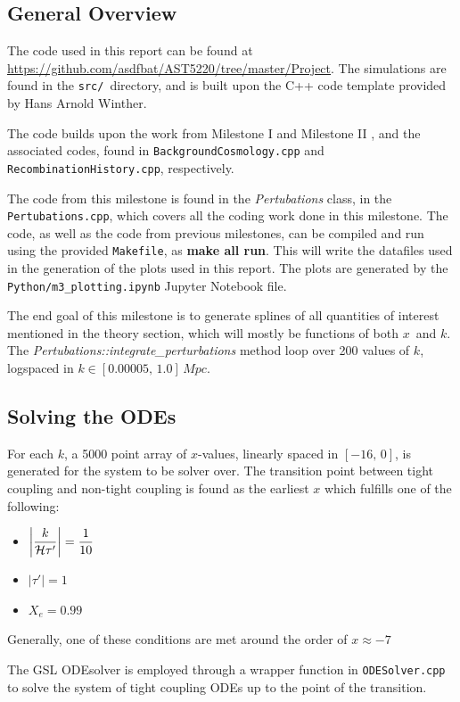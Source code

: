 \documentclass[10pt, a4paper]{article}
\begin{document}
\subsection{General Overview}
The code used in this report can be found at \url{https://github.com/asdfbat/AST5220/tree/master/Project}. The simulations are found in the \texttt{src/} directory, and is built upon the C++ code template provided by Hans Arnold Winther.

The code builds upon the work from Milestone I \cite{Milestone1} and Milestone II \cite{Milestone2}, and the associated codes, found in \texttt{BackgroundCosmology.cpp} and \texttt{RecombinationHistory.cpp}, respectively.

The code from this milestone is found in the \textit{Pertubations} class, in the \texttt{Pertubations.cpp}, which covers all the coding work done in this milestone. The code, as well as the code from previous milestones, can be compiled and run using the provided \texttt{Makefile}, as \textbf{make all run}. This will write the datafiles used in the generation of the plots used in this report. The plots are generated by the \texttt{Python/m3\_plotting.ipynb} Jupyter Notebook file.

The end goal of this milestone is to generate splines of all quantities of interest mentioned in the theory section, which will mostly be functions of both $x$ and $k$. The \textit{Pertubations::integrate\_perturbations} method loop over 200 values of $k$, logspaced in $k\in [0.00005,\, 1.0]\, \si{Mpc}$.

\subsection{Solving the ODEs}
For each $k$, a 5000 point array of $x$-values, linearly spaced in $[-16,\, 0]$, is generated for the system to be solver over. The transition point between tight coupling and non-tight coupling is found as the earliest $x$ which fulfills one of the following:
\begin{itemize}
    \item $\qty|\dfrac{k}{\mathcal{H}\tau'}| = \dfrac{1}{10}$
    \item $|\tau'| = 1$
    \item $X_e = 0.99$\quad {}
\end{itemize}
Generally, one of these conditions are met around the order of $x \approx -7$

The GSL ODEsolver is employed through a wrapper function in \texttt{ODESolver.cpp} to solve the system of tight coupling ODEs up to the point of the transition.
\end{document}

